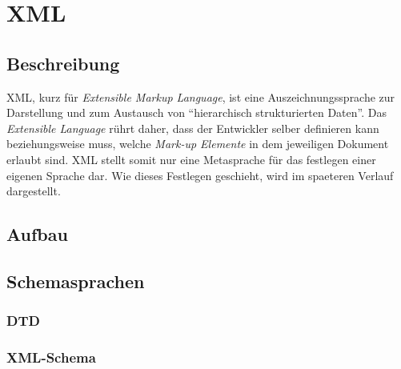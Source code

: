 \chapter{XML}
\section{Beschreibung}
XML, kurz für {\em Extensible Markup Language}, ist eine
Auszeichnungssprache zur Darstellung und zum Austausch von
\enquote{hierarchisch strukturierten Daten}\cite{wiki:de:xml}.  Das {\em
Extensible Language} rührt daher, dass der Entwickler selber
definieren kann beziehungsweise muss, welche {\em Mark-up Elemente} in
dem jeweiligen Dokument erlaubt sind.  XML stellt somit nur eine
Metasprache für das festlegen einer eigenen Sprache dar. Wie dieses
Festlegen geschieht, wird im spaeteren Verlauf dargestellt.

\section{Aufbau}


\section{Schemasprachen}
\subsection{DTD}
\subsection{XML-Schema}